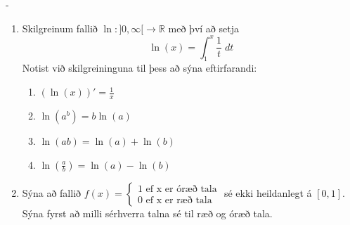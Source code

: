 \begin{adjustwidth}{-\hangingaefingar}{}
\begin{enumerate}
\vspace{2mm}

\item Skilgreinum fallið $\ln : ]0,\infty[ \to \mathbb{R}$ með því að setja
$$
\ln(x) = \int_{1}^{x} \frac{1}{t} \; dt
$$
Notist við skilgreininguna til þess að sýna eftirfarandi:
\begin{enumerate}
\setlength\itemsep{4mm}
\item $\displaystyle \left(\ln(x)\right)' = \frac{1}{x}$
\item $\displaystyle \ln\left(a^{b}\right) = b\ln(a)$
\item $\displaystyle \ln\left(ab\right) = \ln(a)+\ln(b)$
\item $\displaystyle \ln\left(\frac{a}{b}\right) = \ln(a) - \ln(b)$
\end{enumerate}

\vspace{2mm}

\item Sýna að fallið $\displaystyle f(x) = \begin{cases} 1 \text{ ef x er óræð tala}\\ 0 \text{ ef x er ræð tala}\end{cases}$ sé ekki heildanlegt á $[0,1]$. Sýna fyrst að milli sérhverra talna sé til ræð og óræð tala.

\end{enumerate}
\end{adjustwidth}

\fi

\if {}
{\if {} \newpage \fi}
\fi


